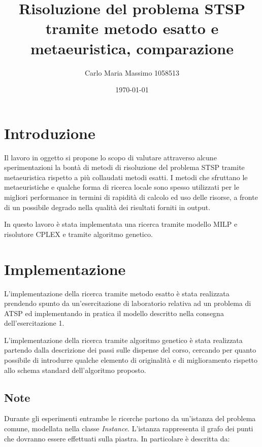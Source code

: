 \documentclass[a4paper]{article}
\begin{document}
\title{Risoluzione del problema STSP tramite metodo esatto e metaeuristica, comparazione}
\author{Carlo Maria Massimo 1058513}
\date{\today}
\maketitle

\tableofcontents

    \section{Introduzione}
    Il lavoro in oggetto si propone lo scopo di valutare attraverso alcune sperimentazioni la bont\`a di metodi
        di risoluzione del problema STSP tramite metaeuristica rispetto a pi\`u collaudati metodi esatti.
        I metodi che sfruttano le metaeuristiche e qualche forma di ricerca locale sono spesso utilizzati per le migliori
        performance in termini di rapidit\`a di calcolo ed uso delle risorse, a fronte di un possibile degrado nella qualit\`a
        dei risultati forniti in output.

        In questo lavoro \`e stata implementata una ricerca tramite modello MILP e risolutore CPLEX e tramite algoritmo genetico.

    \section{Implementazione}
        L'implementazione della ricerca tramite metodo esatto \`e stata realizzata prendendo spunto da un'esercitazione di laboratorio
        relativa ad un problema di ATSP ed implementando in pratica il modello descritto nella consegna dell'esercitazione 1.

        L'implementazione della ricerca tramite algoritmo genetico \`e stata realizzata partendo dalla descrizione dei passi
        sulle dispense del corso, cercando per quanto possibile di introdurre qualche elemento di originalit\`a e di miglioramento rispetto
        allo schema standard dell'algoritmo proposto.

        \subsection{Note}
        Durante gli esperimenti entrambe le ricerche partono da un'istanza del problema comune, modellata nella classe \emph{Instance}.
        L'istanza rappresenta il grafo dei punti che dovranno essere effettuati sulla piastra.
        In particolare \`e descritta da:
\end{document}
